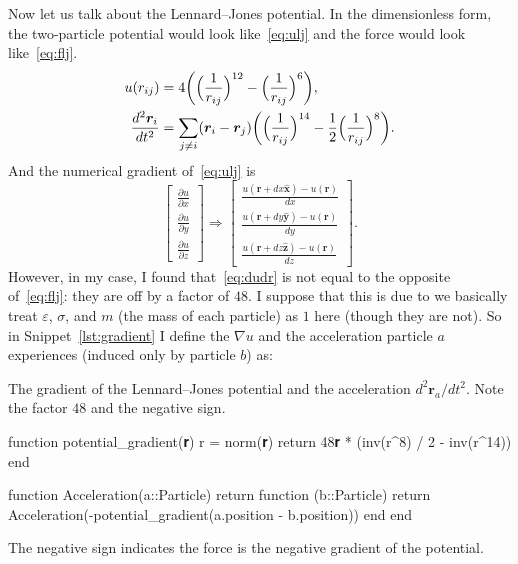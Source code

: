 Now let us talk about the Lennard--Jones potential. In the dimensionless form,
the two-particle potential would look like~\eqref{eq:ulj} and the force would
look like~\eqref{eq:flj}.
%
\begin{align}
    u(r_{ij})                      & = 4 \biggl( \Bigl( \frac{ 1 }{ r_{ij} } \Bigr)^{12}
    -\Bigl( \frac{ 1 }{ r_{ij} } \Bigr)^6 \biggr), \label{eq:ulj}                        \\
    \frac{ d^2 \bm{r}_i }{ d t^2 } & = \sum_{j \neq i} (\bm{r}_i - \bm{r}_j)
    \biggl( \Bigl( \frac{ 1 }{ r_{ij} } \Bigr)^{14}
    -\frac{ 1 }{ 2 } \Bigl( \frac{ 1 }{ r_{ij} } \Bigr)^8 \biggr). \label{eq:flj}
\end{align}
%
And the numerical gradient of~\eqref{eq:ulj} is
%
\begin{equation}\label{eq:dudr}
    \begin{bmatrix}
        \frac{ \partial u }{ \partial x } \\
        \frac{ \partial u }{ \partial y } \\
        \frac{ \partial u }{ \partial z }
    \end{bmatrix}
    \Rightarrow
    \begin{bmatrix}
        \frac{ u(\bm{r} + dx \hat{\bm{x}}) - u(\bm{r}) }{ dx } \\
        \frac{ u(\bm{r} + dy \hat{\bm{y}}) - u(\bm{r}) }{ dy } \\
        \frac{ u(\bm{r} + dz \hat{\bm{z}}) - u(\bm{r}) }{ dz }
    \end{bmatrix}.
\end{equation}
%
However, in my case, I found that~\eqref{eq:dudr} is not equal to the opposite
of~\eqref{eq:flj}: they are off by a factor of $48$.
I suppose that this is due to we basically treat
$\varepsilon$, $\sigma$, and $m$ (the mass of each particle) as $1$ here (though they
are not). So in Snippet~\ref{lst:gradient} I define the $\nabla u$ and the acceleration
particle $a$ experiences (induced only by particle $b$) as:

\begin{algorithm}
    \caption{The gradient of the Lennard--Jones potential and the acceleration
        $d^2 \bm{r}_a / d t^2$. Note the factor $48$ and the negative sign.}
    \label{lst:gradient}
    \begin{juliacode}
        function potential_gradient(𝐫)
            r = norm(𝐫)
            return 48𝐫 * (inv(r^8) / 2 - inv(r^14))
        end

        function Acceleration(a::Particle)
            return function (b::Particle)
                return Acceleration(-potential_gradient(a.position - b.position))
            end
        end
    \end{juliacode}
\end{algorithm}

The negative sign indicates the force is the negative gradient of the potential.

